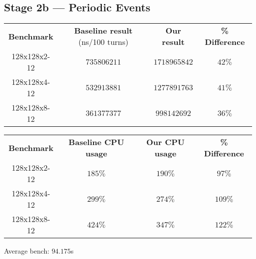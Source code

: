 \documentclass[11pt,a4paper,dvipsnames,cmyk]{scrartcl}
\begin{document}
\subsection*{Stage 2b --- Periodic Events}%
\label{sub:periodic-events}
\begin{center}
    \begin{tabular}{|c|c|c|c|}
        \hline
        \textbf{Benchmark} & \textbf{Baseline result} (ns/100 turns) &
        \textbf{Our result} & \textbf{\% Difference} \\ \hhline{|=|=|=|=|}
        128x128x2-12 & $735806211$ & $1718965842$ & $42\%$ \\ \hline
        128x128x4-12 & $532913881$ & $1277891763$ & $41\%$ \\ \hline
        128x128x8-12 & $361377377$ & $998142692$ & $36\%$ \\ \hline
    \end{tabular}
\end{center}
\begin{center}
    \begin{tabular}{|c|c|c|c|}
        \hline
        \textbf{Benchmark} & \textbf{Baseline CPU usage} &
        \textbf{Our CPU usage} & \textbf{\% Difference} \\ \hhline{|=|=|=|=|}
        128x128x2-12 & $185\%$ & $190\%$ & $97\%$ \\ \hline
        128x128x4-12 & $299\%$ & $274\%$ & $109\%$ \\ \hline
        128x128x8-12 & $424\%$ & $347\%$ & $122\%$ \\ \hline
    \end{tabular}
\end{center}

Average bench: $94.175$s
\end{document}
